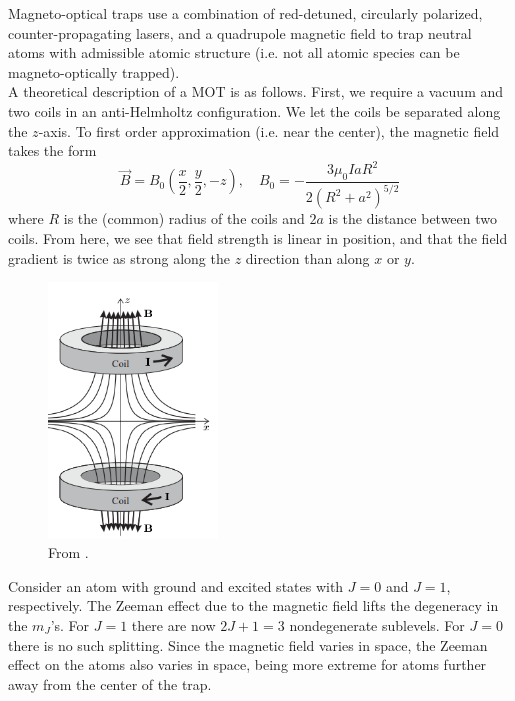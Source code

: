 \documentclass{book}
\theoremstyle{definition}
\newcommand{\f}[2]{\frac{#1}{#2}}
\newcommand{\lp}{\left(}
\newcommand{\rp}{\right)}
\begin{document}
Magneto-optical traps use a combination of red-detuned, circularly polarized, counter-propagating lasers, and a quadrupole magnetic field to trap neutral atoms with admissible atomic structure (i.e. not all atomic species can be magneto-optically trapped). \\


A theoretical description of a MOT is as follows. First, we require a vacuum and two coils in an anti-Helmholtz configuration. We let the coils be separated along the $z$-axis. To first order approximation (i.e. near the center), the magnetic field takes the form
\begin{equation*}
\vec{B} = B_0 \lp \f{x}{2}, \f{y}{2}, -z \rp, \quad B_0 = -\f{3\mu_0 I a R^2}{2(R^2 + a^2)^{5/2}}
\end{equation*}
where $R$ is the (common) radius of the coils and $2a$ is the distance between two coils. From here, we see that field strength is linear in position, and that the field gradient is twice as strong along the $z$ direction than along $x$ or $y$. 


\begin{figure}[!htb]
	\centering
	\includegraphics[width=0.4\textwidth]{images/anti-helmholtz}
	\caption{From \cite{foot2005atomic}.}
\end{figure}

Consider an atom with ground and excited states with $J=0$ and $J=1$, respectively. The Zeeman effect due to the magnetic field lifts the degeneracy in the $m_J$'s. For $J=1$ there are now $2J+1 = 3$ nondegenerate sublevels. For $J=0$ there is no such splitting. Since the magnetic field varies in space, the Zeeman effect on the atoms also varies in space, being more extreme for atoms further away from the center of the trap. \\
\end{document}
